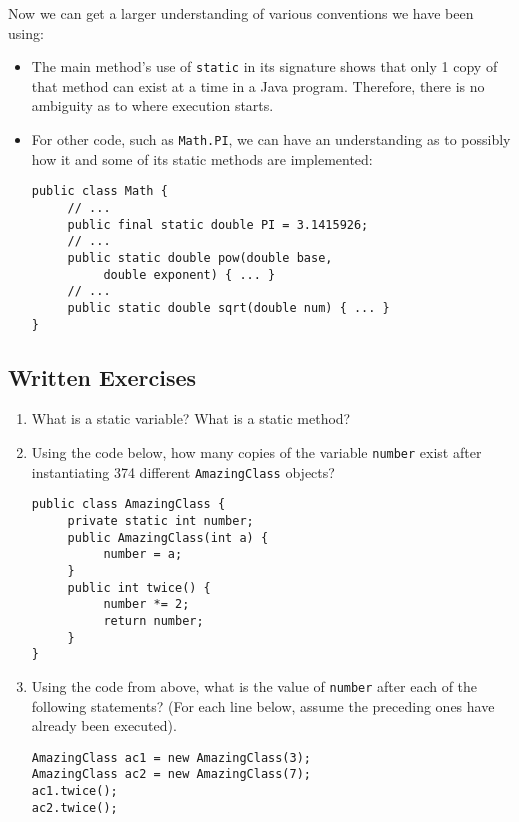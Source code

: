 Now we can get a larger understanding of various conventions we have been using:
\begin{itemize}
\item The main method's use of \verb|static| in its signature shows that only 1 copy of that method can exist at a time in a Java program. Therefore, there is no ambiguity as to where execution starts.
\item For other code, such as \verb|Math.PI|, we can have an understanding as to possibly how it and some of its static methods are implemented:
\begin{lstlisting}
public class Math {
     // ...
     public final static double PI = 3.1415926;
     // ...
     public static double pow(double base,
          double exponent) { ... }
     // ...
     public static double sqrt(double num) { ... }
}
\end{lstlisting}

\end{itemize}

\subsection{Written Exercises}

\setcounter{counter}{1}
\begin{enumerate}[label={\arabic{counter}\addtocounter{counter}{1}}.]

\item What is a static variable? What is a static method?

\item Using the code below, how many copies of the variable \verb|number| exist after instantiating 374 different \verb|AmazingClass| objects?
\begin{lstlisting}
public class AmazingClass {
     private static int number;
     public AmazingClass(int a) {
          number = a;
     }
     public int twice() {
          number *= 2;
          return number;
     }
}
\end{lstlisting}

\item Using the code from above, what is the value of \verb|number| after each of the following statements? (For each line below, assume the preceding ones have already been executed).
\begin{lstlisting}
AmazingClass ac1 = new AmazingClass(3);
AmazingClass ac2 = new AmazingClass(7);
ac1.twice();
ac2.twice();
\end{lstlisting}

\end{enumerate}